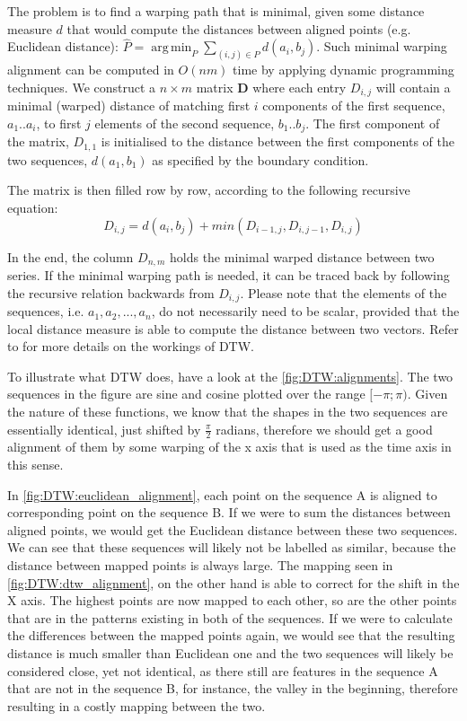 \documentclass[parskip]{cs4rep}
\DeclareMathOperator*{\argmin}{arg\,min}
\begin{document}
The problem is to find a warping path that is minimal, given some distance measure $d$ that would compute the distances between aligned points (e.g. Euclidean distance): $\hat{P} = \argmin_P \sum_{(i,j) \in P} d(a_i, b_j)$. Such minimal warping alignment can be computed in $O(nm)$ time by applying dynamic programming techniques. We construct a $n \times m$ matrix $\mathbf{D}$ where each entry $D_{i,j}$ will contain a minimal (warped) distance of matching first $i$ components of the first sequence, $a_1..a_i$, to first $j$ elements of the second sequence, $b_1..b_j$. The first component of the matrix, $D_{1,1}$ is initialised to the distance between the first components of the two sequences, $d(a_1, b_1)$ as specified by the boundary condition.

The matrix is then filled row by row, according to the following recursive equation:
$$D_{i,j} = d(a_i, b_j) + min(D_{i-1, j}, D_{i, j-1}, D_{i,j})$$

In the end, the column $D_{n,m}$ holds the minimal warped distance between two series.
If the minimal warping path is needed, it can be traced back by following the recursive relation backwards from $D_{i,j}$. Please note that the elements of the sequences, i.e. $a_1, a_2, ..., a_n$, do not necessarily need to be scalar, provided that the local distance measure is able to compute the distance between two vectors. Refer to \citep{Muller:2007bo} for more details on the workings of DTW.

To illustrate what DTW does, have a look at the \autoref{fig:DTW:alignments}. The two sequences in the figure are sine and cosine plotted over the range $[-\pi; \pi)$. Given the nature of these functions, we know that the shapes in the two sequences are essentially identical, just shifted by $\frac{\pi}{2}$ radians, therefore we should get a good alignment of them by some warping of the x axis that is used as the time axis in this sense.

In \autoref{fig:DTW:euclidean_alignment}, each point on the sequence A is aligned to corresponding point on the sequence B. If we were to sum the distances between aligned points, we would get the Euclidean distance between these two sequences. We can see that these sequences will likely not be labelled as similar, because the distance between mapped points is always large. The mapping seen in \autoref{fig:DTW:dtw_alignment}, on the other hand is able to correct for the shift in the X axis. 
The highest points are now mapped to each other, so are the other points that are in the patterns existing in both of the sequences. If we were to calculate the differences between the mapped points again, we would see that the resulting distance is much smaller than Euclidean one and the two sequences will likely be considered close, yet not identical, as there still are features in the sequence A that are not in the sequence B, for instance, the valley in the beginning, therefore resulting in a costly mapping between the two.
\end{document}
